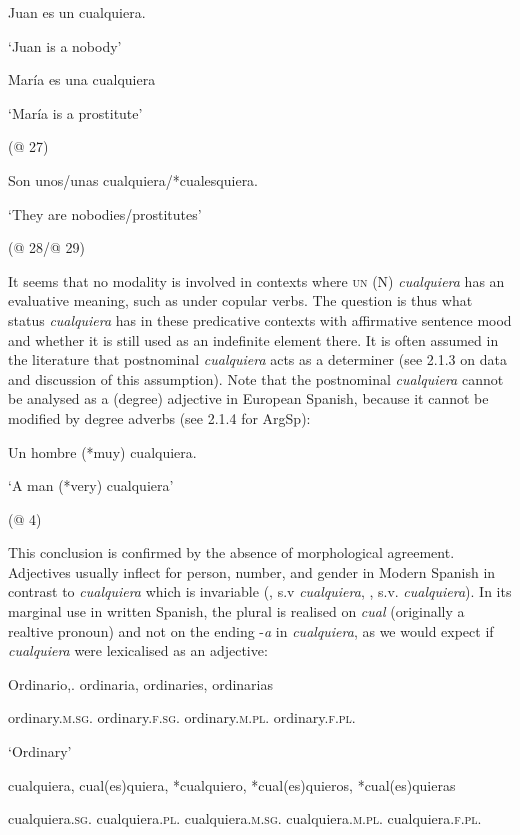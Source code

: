 \documentclass[output=paper]{langscibook}
\begin{document}
\label{bkm:Ref150778470}  Juan es un cualquiera.

  ‘Juan is a nobody’ 

  \citep[36]{Martínez2005}

\label{bkm:Ref150778472}  María es una cualquiera

  ‘María is a prostitute’

  (@ 27)

\label{bkm:Ref533761216}  Son unos/unas cualquiera/*cualesquiera.

  ‘They are nobodies/prostitutes’

  (@ 28/@ 29)

It seems that no modality is involved in contexts where \textsc{un} (N) \textit{cualquiera} has an evaluative meaning, such as under copular verbs. The question is thus what status \textit{cualquiera} has in these predicative contexts with affirmative sentence mood and whether it is still used as an indefinite element there. It is often assumed in the literature that postnominal \textit{cualquiera} acts as a determiner (see 2.1.3 on data and discussion of this assumption). Note that the postnominal \textit{cualquiera} cannot be analysed as a (degree) adjective in European Spanish, because it cannot be modified by degree adverbs (see 2.1.4 for ArgSp):

  Un hombre (*muy) cualquiera.

  ‘A man (*very) cualquiera’

  (@ 4)

This conclusion is confirmed by the absence of morphological agreement. Adjectives usually inflect for person, number, and gender in Modern Spanish in contrast to \textit{cualquiera} which is invariable (\citealt{Seco1986}, s.v \textit{cualquiera}, \citealt{Rainer1993}, s.v. \textit{cualquiera}). In its marginal use in written Spanish, the plural is realised on \textit{cual} (originally a realtive pronoun) and not on the ending -\textit{a} in \textit{cualquiera}, as we would expect if \textit{cualquiera} were lexicalised as an adjective:

  Ordinario,.  ordinaria,  ordinaries,  ordinarias

  ordinary.\textsc{m.sg.}  ordinary.\textsc{f.sg}.  ordinary.\textsc{m.pl}.  ordinary.\textsc{f.pl.}

  ‘Ordinary’

  cualquiera,   cual(es)quiera,  *cualquiero,  *cual(es)quieros,  *cual(es)quieras

  cualquiera.\textsc{sg}.  cualquiera.\textsc{pl}.  cualquiera.\textsc{m.sg}.  cualquiera.\textsc{m.pl.}  cualquiera.\textsc{f.pl.}
\end{document}
